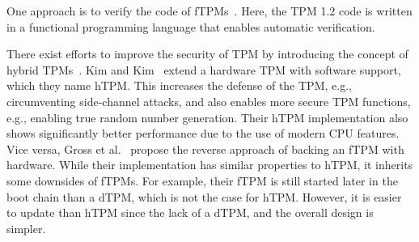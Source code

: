 One approach is to verify the code of fTPMs~\cite{Mukhamedov2013}.
Here, the TPM 1.2 code is written in a functional programming language that enables automatic verification.

There exist efforts to improve the security of TPM by introducing the concept of hybrid TPMs~\cite{Kim2019, Gross2021}.
Kim and Kim~\cite{Kim2019} extend a hardware TPM with software support, which they name hTPM\@.
This increases the defense of the TPM, e.g., circumventing side-channel attacks, and also enables more secure TPM functions, e.g., enabling true random number generation.
Their hTPM implementation also shows significantly better performance due to the use of modern CPU features.
Vice versa, Gross et al.~\cite{Gross2021} propose the reverse approach of backing an fTPM with hardware.
While their implementation has similar properties to hTPM, it inherits some downsides of fTPMs.
For example, their fTPM is still started later in the boot chain than a dTPM, which is not the case for hTPM\@.
However, it is easier to update than hTPM since the lack of a dTPM, and the overall design is simpler.







